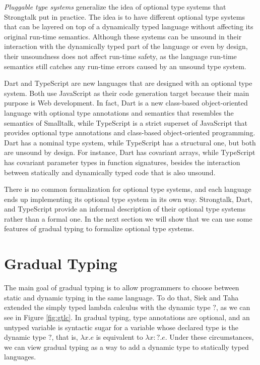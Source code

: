 \emph{Pluggable type systems} \cite{bracha2004pluggable} generalize
the idea of optional type systems that Strongtalk put in practice.
The idea is to have different optional type systems that can be layered
on top of a dynamically typed language without affecting its original
run-time semantics.
Although these systems can be unsound in their interaction with the
dynamically typed part of the language or even by design, their
unsoundness does not affect run-time safety, as the language run-time
semantics still catches any run-time errors caused by an unsound
type system.

Dart \cite{dart} and TypeScript \cite{typescript} are new
languages that are designed with an optional type system.
Both use JavaScript as their code generation target because
their main purpose is Web development.
In fact, Dart is a new class-based object-oriented language with
optional type annotations and semantics that resembles the
semantics of Smalltalk, while TypeScript is a strict superset of
JavaScript that provides optional type annotations and class-based
object-oriented programming.
Dart has a nominal type system, while TypeScript has a structural
one, but both are unsound by design.
For instance, Dart has covariant arrays, while TypeScript has
covariant parameter types in function signatures,
besides the interaction between statically and dynamically
typed code that is also unsound.

There is no common formalization for optional type systems, and
each language ends up implementing its optional type system in
its own way.
Strongtalk, Dart, and TypeScript provide an informal description of
their optional type systems rather than a formal one.
In the next section we will show that we can use some features
of gradual typing \cite{siek2006gradual,siek2007objects} to
formalize optional type systems.

\section{Gradual Typing}
\label{sec:gradual}

\label{def:dynamictype}
The main goal of gradual typing \cite{siek2006gradual} is to allow
programmers to choose between static and dynamic typing in the same
language.
To do that, Siek and Taha \cite{siek2006gradual} extended the simply
typed lambda calculus with the dynamic type $?$, as we can see in
Figure \ref{fig:gtlc}.
In gradual typing, type annotations are optional, and an untyped
variable is syntactic sugar for a variable whose declared type is
the dynamic type $?$, that is, $\lambda x.e$ is equivalent to $\lambda x{:}?.e$.
Under these circumstances, we can view gradual typing as a way to add
a dynamic type to statically typed languages.

